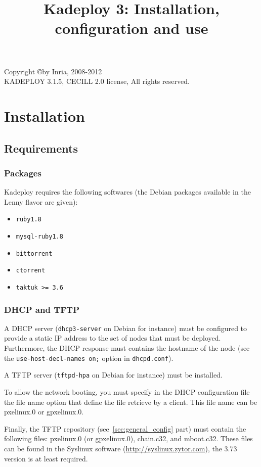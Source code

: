 \documentclass[a4wide,10pt,oneside]{book}
\title{Kadeploy 3: Installation, configuration and use}
\newcommand{\version}{3.1.5}
\begin{document}
\maketitle

\vspace*{18cm}
\noindent Copyright \copyright by Inria, 2008-2012\\
KADEPLOY \version, CECILL 2.0 license, All rights reserved.

\tableofcontents

\chapter{Installation}
\section{Requirements}
\subsection{Packages}\label{sec:required-packages}
Kadeploy requires the following softwares (the Debian packages available in the Lenny flavor are given):
\begin{itemize}
\item \texttt{ruby1.8}
\item \texttt{mysql-ruby1.8}
\item \texttt{bittorrent}
\item \texttt{ctorrent}
\item \texttt{taktuk >= 3.6}
\end{itemize}

\subsection{DHCP and TFTP}
A DHCP server (\texttt{dhcp3-server} on Debian for instance) must be configured to provide a static IP address to the set of nodes that must be deployed. Furthermore, the DHCP response must contains the hostname of the node (see the \texttt{use-host-decl-names on;} option in \texttt{dhcpd.conf}).

A TFTP server (\texttt{tftpd-hpa} on Debian for instance) must be installed.

To allow the network booting, you must specify in the DHCP configuration file the file name option that define the file retrieve by a client. This file name can be pxelinux.0 or gpxelinux.0.

Finally, the TFTP repository (see~\ref{sec:general_config} part) must contain the following files: pxelinux.0 (or gpxelinux.0), chain.c32, and mboot.c32. These files can be found in the Syslinux software (\url{http://syslinux.zytor.com}), the 3.73 version is at least required.
\end{document}
